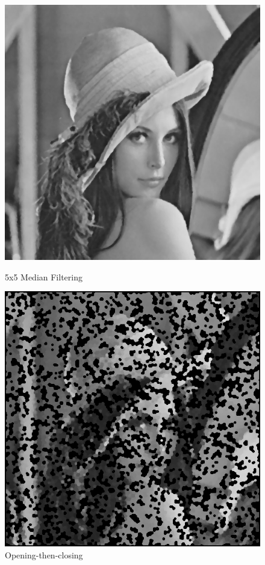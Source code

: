 \documentclass{article}
\begin{document}
\begin{figure}[H]
  \includegraphics[width=\linewidth]{img/snp10_median_5x5.png}
  \caption{5x5 Median Filtering}\label{fig:snp10_median_5x5}
\endminipage\hfill
{}
  \includegraphics[width=\linewidth]{img/snp10_open_then_close.png}
  \caption{Opening-then-closing}\label{fig:snp10_open_then_close}
\endminipage\hfill
\end{figure}
\end{document}
